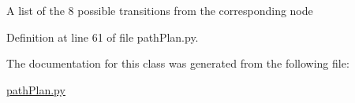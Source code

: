 A list of the 8 possible transitions from the corresponding node 



Definition at line 61 of file path\+Plan.\+py.



The documentation for this class was generated from the following file\+:\begin{DoxyCompactItemize}
\item 
\mbox{\hyperlink{path_plan_8py}{path\+Plan.\+py}}\end{DoxyCompactItemize}
